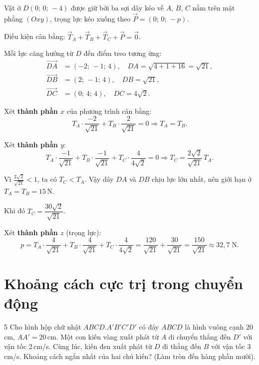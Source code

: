 \begin{loigiai}
Vật ở $D(0;\,0;\,-4)$ được giữ bởi ba sợi dây kéo về $A$, $B$, $C$ nằm trên mặt phẳng $(Oxy)$, trọng lực kéo xuống theo $\vec{P} = (0;\,0;\,-p)$.

Điều kiện cân bằng: $\vec{T}_A + \vec{T}_B + \vec{T}_C + \vec{P} = \vec{0}$.

Mỗi lực căng hướng từ $D$ đến điểm treo tương ứng:
\begin{align*}
\overrightarrow{DA} &= (-2;\,-1;\,4), \quad DA = \sqrt{4 + 1 + 16} = \sqrt{21}, \\
\overrightarrow{DB} &= (2;\,-1;\,4), \quad DB = \sqrt{21}, \\
\overrightarrow{DC} &= (0;\,4;\,4), \quad DC = 4\sqrt{2}.
\end{align*}

Xét \textbf{thành phần $x$} của phương trình cân bằng:
\[ T_A \cdot \frac{-2}{\sqrt{21}} + T_B \cdot \frac{2}{\sqrt{21}} = 0 \Rightarrow T_A = T_B. \]

Xét \textbf{thành phần $y$}:
\[ T_A \cdot \frac{-1}{\sqrt{21}} + T_B \cdot \frac{-1}{\sqrt{21}} + T_C \cdot \frac{4}{4\sqrt{2}} = 0 \Rightarrow T_C = \frac{2\sqrt{2}}{\sqrt{21}}\,T_A. \]

Vì $\frac{2\sqrt{2}}{\sqrt{21}} < 1$, ta có $T_C < T_A$. Vậy dây $DA$ và $DB$ chịu lực lớn nhất, nên giới hạn ở $T_A = T_B = 15$\,N.

Khi đó $T_C = \dfrac{30\sqrt{2}}{\sqrt{21}}$.

Xét \textbf{thành phần $z$} (trọng lực):
\[ p = T_A \cdot \frac{4}{\sqrt{21}} + T_B \cdot \frac{4}{\sqrt{21}} + T_C \cdot \frac{4}{4\sqrt{2}} = \frac{120}{\sqrt{21}} + \frac{30}{\sqrt{21}} = \frac{150}{\sqrt{21}} \approx \boxed{32{,}7\;\text{N}}. \]
\end{loigiai}

\separator

\section{Khoảng cách cực trị trong chuyển động}

\begin{baitoan}{5 \hfill {}}
Cho hình hộp chữ nhật $ABCD.A'B'C'D'$ có đáy $ABCD$ là hình vuông cạnh 20\,cm, $AA' = 20$\,cm. Một con kiến vàng xuất phát từ $A$ di chuyển thẳng đến $D'$ với vận tốc 2\,cm/s. Cùng lúc, kiến đen xuất phát từ $D$ đi thẳng đến $B$ với vận tốc 3\,cm/s. Khoảng cách ngắn nhất của hai chú kiến? (Làm tròn đến hàng phần mười).
\end{baitoan}

